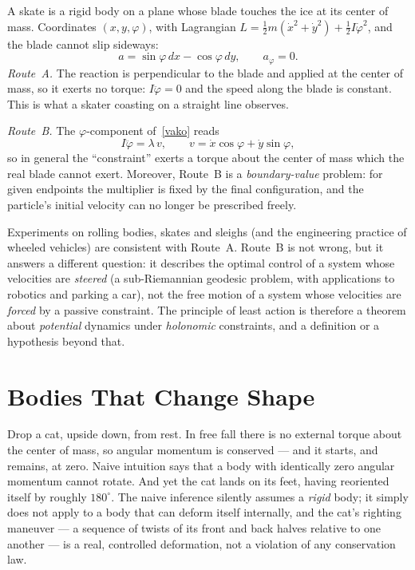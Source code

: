 \begin{example}[A skate]\label{skate}
A skate is a rigid body on a plane whose blade touches the ice at its center
of mass. Coordinates $(x,y,\varphi)$, with Lagrangian
$L=\tfrac12m(\dot x^2+\dot y^2)+\tfrac12I\dot\varphi^2$, and the blade cannot
slip sideways:
\[
  a=\sin\varphi\,dx-\cos\varphi\,dy,\qquad a_\varphi=0 .
\]
\emph{Route~A.} The reaction is perpendicular to the blade and applied at the
center of mass, so it exerts no torque: $I\ddot\varphi=0$ and the speed along
the blade is constant. This is what a skater coasting on a straight line
observes.

\emph{Route~B.} The $\varphi$-component of~\eqref{vako} reads
\[
  I\ddot\varphi=\lambda\,v,\qquad v=\dot x\cos\varphi+\dot y\sin\varphi,
\]
so in general the ``constraint'' exerts a torque about the center of mass
which the real blade cannot exert. Moreover, Route~B is a
\emph{boundary-value} problem: for given endpoints the multiplier is fixed
by the final configuration, and the particle's initial velocity can no longer be
prescribed freely.
\end{example}

Experiments on rolling bodies, skates and sleighs (and the engineering
practice of wheeled vehicles) are consistent with Route~A. Route~B is not
wrong, but it answers a different question: it describes the optimal control
of a system whose velocities are \emph{steered} (a sub-Riemannian
geodesic problem, with applications to robotics and parking a car), not the
free motion of a system whose velocities are \emph{forced} by a passive
constraint. The principle of least action is therefore a theorem about
\emph{potential} dynamics under \emph{holonomic} constraints, and a
definition or a hypothesis beyond that.


\section{Bodies That Change Shape}
\label{ap:shape}

Drop a cat, upside down, from rest. In free fall there is no
external torque about the center of mass, so angular momentum is
conserved --- and it starts, and remains, at zero. Naive intuition
says that a body with identically zero angular momentum cannot
rotate. And yet the cat lands on its feet, having reoriented itself
by roughly $180^\circ$. The naive inference silently assumes a
\emph{rigid} body; it simply does not apply to a body that can
deform itself internally, and the cat's righting maneuver --- a
sequence of twists of its front and back halves relative to one
another --- is a real, controlled deformation, not a violation of
any conservation law.

